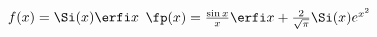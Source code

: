 {$f(x) = \Si(x) \erfi x$
}
{$\fp(x) = \frac{\sin x}{x} \erfi x + \frac{2}{\sqrt{\pi}} \Si(x)e^{x^2}$
}
